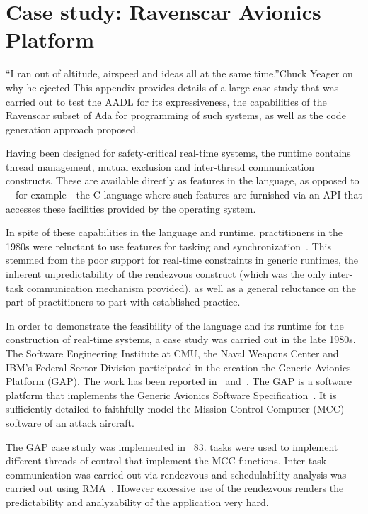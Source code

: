 \chapter{Case study: Ravenscar Avionics Platform}{``I ran out of
  altitude, airspeed and ideas all at the same time.''}{Chuck Yeager
    on why he ejected}
\label{chap:rap}
This appendix provides details of a large case study that was carried
out to test the AADL for its expressiveness, the capabilities of the
Ravenscar subset of Ada for programming of such systems, as well as
the code generation approach proposed.

Having been designed for safety-critical real-time systems, the \ada
runtime contains thread management, mutual exclusion and inter-thread
communication constructs. These are available directly as features in
the language, as opposed to---for example---the C language where such
features are furnished via an API that accesses these facilities
provided by the operating system.

In spite of these capabilities in the language and runtime,
practitioners in the 1980s were reluctant to use  features for
tasking and synchronization~\cite{cornhill@irtaw87}. This stemmed from
the poor support for real-time constraints in generic 
runtimes, the inherent unpredictability of the rendezvous construct
(which was the only inter-task communication mechanism provided), as
well as a general reluctance on the part of practitioners to part with
established practice.

In order to demonstrate the feasibility of the \ada language and its
runtime for the construction of real-time systems, a case study was
carried out in the late 1980s. The Software Engineering Institute at
CMU, the Naval Weapons Center and IBM's Federal Sector Division
participated in the creation the Generic Avionics Platform (GAP). The
work has been reported in~\cite{locke@rtss91}
and~\cite{locke@irtaw90}. The GAP is a software platform that
implements the Generic Avionics Software
Specification~\cite{locke@sei90}. It is sufficiently detailed to
faithfully model the Mission Control Computer (MCC) software of an
attack aircraft.

The GAP case study was implemented in \ada~83. \ada tasks were used to
implement different threads of control that implement the MCC
functions. Inter-task communication was carried out via rendezvous and
schedulability analysis was carried out using
RMA~\cite{liu@jacm73,liu@jacm73}. However excessive use of the \ada
rendezvous renders the predictability and analyzability of the
application very hard.

